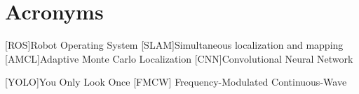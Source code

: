 \chapter*{Acronyms}
	\begin{acronym}[RELAX NG]
	[ROS]{Robot Operating System}
	[SLAM]{Simultaneous localization and mapping}
    [AMCL]{Adaptive Monte Carlo Localization}
	[CNN]{Convolutional Neural Network}
	

	[YOLO]{You Only Look Once}
	 [FMCW] Frequency-Modulated Continuous-Wave
	
	\end{acronym}